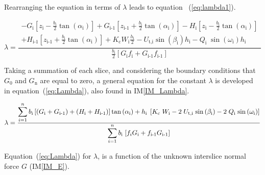 \documentclass[12pt]{article}
\newcommand{\iref}[1]{IM\ref{#1}}
\begin{document}
\noindent
Rearranging the equation in terms of $\lambda$ leads to equation
~(\ref{eq:lambda1}).

\begin{equation}\label{eq:lambda1}
  \lambda = \frac { \begin{array}{l} - {G}_{\text{i}} \left[
        {z_{\text{i}}} - \frac{b_{\text{i}}}{2} {
          \tan\left(\alpha_{\text{i}}\right)} \right] +
      {G}_{\text{i-1}} \left[ {z_{\text{i-1}}} +
        \frac{b_{\text{i}}}{2} { \tan\left(\alpha_{\text{i}}\right)}
        \right] - H_{\text{i}}\left[ z_{\text{i}} -
        \frac{b_{\text{i}}}{2} { \tan\left(\alpha_{\text{i}}\right)}
        \right] \\[5pt] + H_{\text{i-1}}\left[ z_{\text{i-1}} +
        \frac{b_{\text{i}}}{2} { \tan\left(\alpha_{\text{i}}\right)}
        \right] + K_{\text{c}} W_{\text{i}} \frac{h_{\text{i}}}{2} -
      U_{\text{t,i}} \sin\left(\beta_{\text{i}}\right) h_{\text{i}} -
      Q_{\text{i}}\;{\sin\left(\omega_{\text{i}}\right)}
      h_{\text{i}} \end{array} } { \frac{b_{\text{i}}}{2} \left[
      G_{\text{i}} f_{\text{i}} + G_{\text{i-1}} f_{\text{i-1}}
      \right] }
\end{equation}

\noindent
Taking a summation of each slice, and considering the boundary
conditions that $G_{\text{0}}$ and $G_{\text{n}}$ are equal to zero, a
general equation for the constant $\lambda$ is developed in
equation~(\ref{eq:Lambda}), also found in \iref{IM_Lambda}.

\begin{equation}\label{eq:Lambda}
\lambda= \frac{ \displaystyle\sum_{i=1}^{n} { {b_{\text{i}}} \left[
      \left({{G}_{\text{i}} + {G}_{\text{i-1}}}\right) +
      \left({{H}_{\text{i}} + {H}_{\text{i-1}}}\right)
      \right]{\tan\left(\alpha_{\text{i}}\right)} \\ +
    {{h}_{\text{i}}}\;\left[ {K_{\text{c}}}\;{W_{\text{i}}} -
      {2}\;{U_{\text{t,i}}}\;{\sin\left(\beta_{\text{i}}\right)} - {2}
      \; Q_{\text{i}}\;{\sin\left(\omega_{\text{i}}\right)} \right] }}
         {\displaystyle\sum_{i=1}^{n} { {{b}_{\text{i}}}\;{\left[{
                   {f_{i}}{{G}_{\text{i}}} +
                   {f_{\text{i-1}}}{{G}_{\text{i-1}}} }\right]} }}
\end{equation}

\noindent
Equation~(\ref{eq:Lambda}) for $\lambda$, is a function of the unknown
interslice normal force $G$ (\iref{IM_E}).
\end{document}
